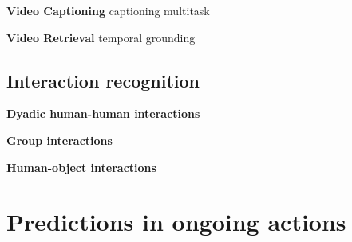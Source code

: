 \documentclass[smallextended,twocolumn,natbib]{svjour3}
\begin{document}
\noindent
\textbf{Video Captioning}  
\citep{alayrac2022flamingo}
\citep{krishna2017dense}
\citep{yang2023vid2seq}
\citep{chen2024panda} 
\citep{ren2024timechat} 
\citep{zhou2024streaming}
\citep{islam2024video}
\citep{mavroudi2023learning}
\citep{iashin2020better}
\citep{iashin2020multi}
\citep{wang2018bidirectional}
\citep{wang2020event}
\citep{chen2021towards}
\citep{deng2021sketch}
\citep{mun2019streamlined}
\citep{rahman2019watch}
\citep{shen2017weakly}
\citep{shi2019dense}
\citep{wang2021end}
\citep{zhou2018end}
\citep{han2023autoad}
\citep{han2023autoadii}
\citep{han2024autoadiii}
\citep{seo2022end}
captioning multitask
\citep{chadha2021iperceive}
\citep{li2018jointly}


\noindent
\textbf{Video Retrieval} 
\citep{gordo2017beyond}
\citep{wang2016learning}
\citep{xu2015jointly}
\citep{torabi2016learning}
\citep{dong2018predicting}
\citep{otani2016learning}
\citep{kim2024you} 
\citep{wray2019fine} 
\citep{wray2021semantic}
\citep{ge2022bridging}
\citep{xue2022advancing}
\citep{gabeur2020multi}
\citep{mithun2018learning}
\citep{liu2019use}
temporal grounding 
\citep{anne2017localizing}
\citep{gao2017tall}
\citep{regneri2013grounding}
\citep{qian2024momentor} 
\citep{gu2024context}
\citep{yang2022tubedetr}
\citep{escorcia2019temporal}
\citep{flanagan2023learning}
\citep{cao2021pursuit}
\citep{chen2018temporally}
\citep{ge2019mac}
\citep{jiang2019cross}
\citep{liu2021context}
\citep{liu2018cross}
\citep{qu2020fine}
\citep{wang2020temporally}
\citep{xu2019multilevel}
\citep{chen2020rethinking}
\citep{hao2022query}
\citep{liu2022memory}
\citep{nan2021interventional}
\citep{yuan2019find}
\citep{zhang2021natural}

\subsection{Interaction recognition}

\noindent
\textbf{Dyadic human-human interactions}

\citep{nguyen2024hig}
\citep{ong2023chaotic}

\noindent
\textbf{Group interactions}

\noindent
\textbf{Human-object interactions}


\section{Predictions in ongoing actions}
\label{sec:prediction}

\citep{huang2018makes}
\end{document}
